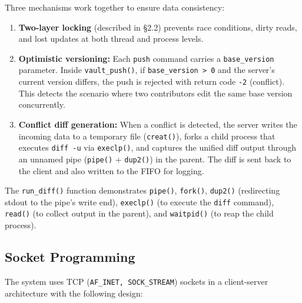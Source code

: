 \documentclass[12pt,a4paper]{article}
\begin{document}
Three mechanisms work together to ensure data consistency:

\begin{enumerate}[itemsep=0.3em]
    \item \textbf{Two-layer locking} (described in \S2.2) prevents race conditions,
          dirty reads, and lost updates at both thread and process levels.

    \item \textbf{Optimistic versioning:} Each \texttt{push} command carries a
          \texttt{base\_version} parameter. Inside \texttt{vault\_push()}, if
          \texttt{base\_version > 0} and the server's current version differs, the
          push is rejected with return code \texttt{-2} (conflict). This detects
          the scenario where two contributors edit the same base version concurrently.

    \item \textbf{Conflict diff generation:} When a conflict is detected, the server
          writes the incoming data to a temporary file (\texttt{creat()}), forks a
          child process that executes \texttt{diff~-u} via \texttt{execlp()}, and
          captures the unified diff output through an unnamed pipe (\texttt{pipe()} +
          \texttt{dup2()}) in the parent. The diff is sent back to the client and
          also written to the FIFO for logging.
\end{enumerate}

The \texttt{run\_diff()} function demonstrates \texttt{pipe()}, \texttt{fork()},
\texttt{dup2()} (redirecting stdout to the pipe's write end), \texttt{execlp()}
(to execute the \texttt{diff} command), \texttt{read()} (to collect output in the
parent), and \texttt{waitpid()} (to reap the child process).

\subsection{Socket Programming}

The system uses TCP (\texttt{AF\_INET, SOCK\_STREAM}) sockets in a client-server
architecture with the following design:
\end{document}
